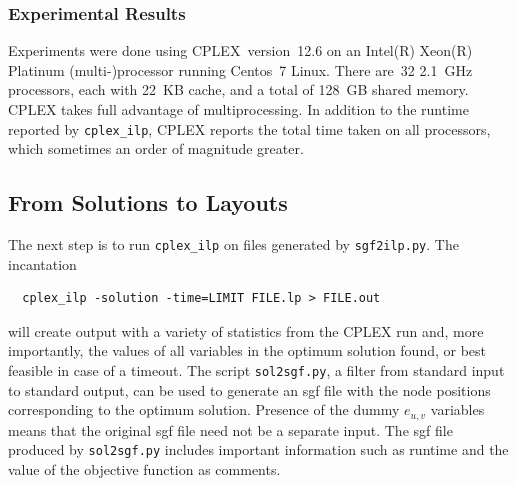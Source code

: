 \subsubsection{Experimental Results}

Experiments were done using CPLEX~version~12.6 on an Intel(R) Xeon(R) Platinum (multi-)processor running Centos~7 Linux.
There are~32 2.1~GHz processors, each with 22~KB cache, and a total of 128~GB shared memory. CPLEX takes full advantage of multiprocessing. In addition to the runtime reported by \texttt{cplex\_ilp}, CPLEX reports the total time taken on all processors, which sometimes an order of magnitude greater. 






\subsection{From Solutions to Layouts} \label{sec:sol2sgf}

The next step is to run \texttt{cplex\_ilp} on files generated by \texttt{sgf2ilp.py}. The incantation
\begin{verbatim}
  cplex_ilp -solution -time=LIMIT FILE.lp > FILE.out
\end{verbatim}
will create output with a variety of statistics from the CPLEX run and, more importantly, the values of all variables in the optimum solution found, or best feasible in case of a timeout.
The script \texttt{sol2sgf.py}, a filter from standard input to standard output, can be used to generate an sgf file with the node positions corresponding to the optimum solution. Presence of the dummy $e_{u,v}$ variables means that the original sgf file need not be a separate input. The sgf file produced by \texttt{sol2sgf.py} includes important information such as runtime and the value of the objective function as comments.

